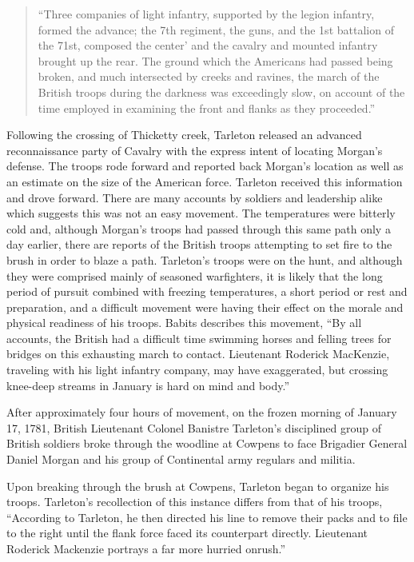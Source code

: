 \begin{quotation}
 ``Three companies of light infantry, supported by the legion infantry, formed
 the advance; the 7th regiment, the guns, and the 1st battalion of the 71st,
 composed the center' and the cavalry and mounted infantry brought up the rear.
 The ground which the Americans had passed being broken, and much intersected
 by creeks and ravines, the march of the British troops during the darkness was
 exceedingly slow, on account of the time employed in examining the front and
 flanks as they proceeded.'' \cite[TAB Q, 14]{rauch_battle_2007}
\end{quotation}

Following the crossing of Thicketty creek, Tarleton released an advanced
reconnaissance party of Cavalry with the express intent of locating Morgan's
defense. The troops rode forward and reported back Morgan's location as well as
an estimate on the size of the American force. Tarleton received this
information and drove forward. There are many accounts by soldiers and
leadership alike which suggests this was not an easy movement. The temperatures
were bitterly cold and, although Morgan's troops had passed through this same
path only a day earlier, there are reports of the British troops attempting to
set fire to the brush in order to blaze a path. Tarleton's troops were on the
hunt, and although they were comprised mainly of seasoned warfighters, it is
likely that the long period of pursuit combined with freezing temperatures, a
short period or rest and preparation, and a difficult movement were having
their effect on the morale and physical readiness of his troops. Babits
describes this movement, ``By all accounts, the British had a difficult time
swimming horses and felling trees for bridges on this exhausting march to
contact. Lieutenant Roderick MacKenzie, traveling with his light infantry
company, may have exaggerated, but crossing knee-deep streams in January is
hard on mind and body.'' \cite[57]{babits_devil_2001}

After approximately four hours of movement, on the frozen morning of January 17,
1781, British Lieutenant Colonel Banistre Tarleton's disciplined group of
British soldiers broke through the woodline at Cowpens to face Brigadier
General Daniel Morgan and his group of Continental army regulars and militia.

Upon breaking through the brush at Cowpens, Tarleton began to organize his
troops. Tarleton's recollection of this instance differs from that of his
troops, ``According to Tarleton, he then directed his line to remove their packs
and to file to the right until the flank force faced its counterpart directly.
Lieutenant Roderick Mackenzie portrays a far more hurried onrush.''
\cite[51]{moncure_cowpens_1996}

